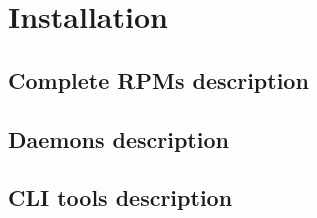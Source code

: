 \section{Installation}
\TODO{}

\subsection{Complete RPMs description}
\subsection{Daemons description}
\subsection{CLI tools description}

